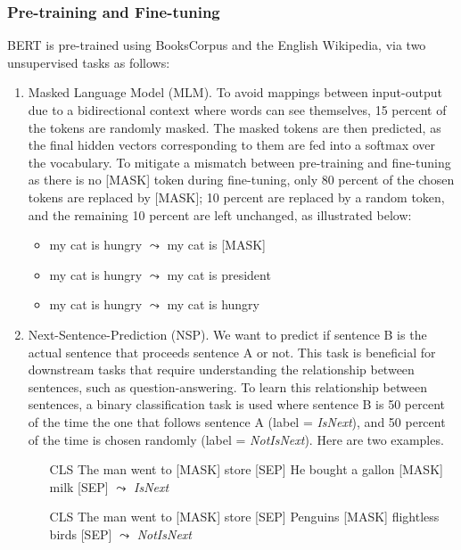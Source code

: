 \documentclass[11pt, a4paper]{amsart}
\begin{document}
\subsubsection{Pre-training and Fine-tuning}

BERT is pre-trained using BooksCorpus and the English Wikipedia, via two unsupervised tasks as follows:

\begin{enumerate}
	\item Masked Language Model (MLM). 
	To avoid mappings between input-output due to a bidirectional context where words can see themselves, 15 percent of the tokens are randomly masked. 
	The masked tokens are then predicted, as the final hidden vectors corresponding to them are fed into a softmax over the vocabulary. 
	To mitigate a mismatch between pre-training and fine-tuning as there is no [MASK] token during fine-tuning, only 80 percent of the chosen tokens are replaced by [MASK]; 10 percent are replaced by a random token, and the remaining 10 percent are left unchanged, as illustrated below:
	\begin{itemize}
		\item my cat is hungry $\leadsto$ my cat is [MASK]
		\item my cat is hungry $\leadsto$ my cat is president
		\item my cat is hungry $\leadsto$ my cat is hungry
	\end{itemize}
	
	\item Next-Sentence-Prediction (NSP).
	We want to predict if sentence B is the actual sentence that proceeds sentence A or not. 
	This task is beneficial for downstream tasks that require understanding the relationship between sentences, such as question-answering.
	To learn this relationship between sentences, a binary classification task is used where sentence B is 50 percent of the time the one that follows sentence A (label = \textit{IsNext}), and 50 percent of the time is chosen randomly (label = \textit{NotIsNext}). 
	Here are two examples.
	\begin{itemize}
		\item [CLS] The man went to [MASK] store [SEP] He bought a gallon [MASK] milk [SEP] $\leadsto$ \textit{IsNext}
		\item [CLS] The man went to [MASK] store [SEP] Penguins [MASK] flightless birds [SEP] $\leadsto$ \textit{NotIsNext}
	\end{itemize}
\end{enumerate}
\end{document}
